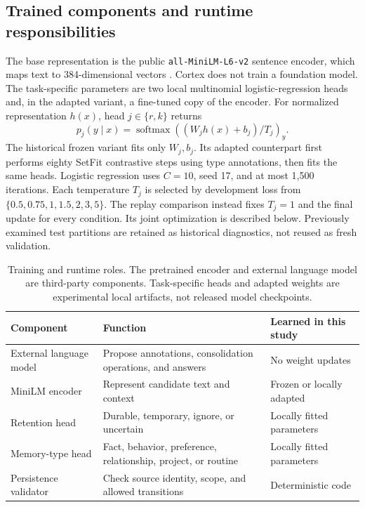 \documentclass[11pt]{article}
\begin{document}
\subsection{Trained components and runtime responsibilities}
The base representation is the public \texttt{all-MiniLM-L6-v2} sentence encoder, which maps text to 384-dimensional vectors \citep{minilmcard}. Cortex does not train a foundation model. The task-specific parameters are two local multinomial logistic-regression heads and, in the adapted variant, a fine-tuned copy of the encoder. For normalized representation $h(x)$, head $j\in\{r,k\}$ returns
\[
 p_j(y\mid x)=\operatorname{softmax}\!\left((W_jh(x)+b_j)/T_j\right)_y.
\]
The historical frozen variant fits only $W_j,b_j$. Its adapted counterpart first performs eighty SetFit contrastive steps using type annotations, then fits the same heads. Logistic regression uses $C=10$, seed 17, and at most 1,500 iterations. Each temperature $T_j$ is selected by development loss from $\{0.5,0.75,1,1.5,2,3,5\}$. The replay comparison instead fixes $T_j=1$ and the final update for every condition. Its joint optimization is described below. Previously examined test partitions are retained as historical diagnostics, not reused as fresh validation.

\begin{table}[htbp]
\centering\small
\begin{tabularx}{\linewidth}{@{}L{.23\linewidth}Y L{.26\linewidth}@{}}
\toprule
Component & Function & Learned in this study\\
\midrule
External language model & Propose annotations, consolidation operations, and answers & No weight updates\\
MiniLM encoder & Represent candidate text and context & Frozen or locally adapted\\
Retention head & Durable, temporary, ignore, or uncertain & Locally fitted parameters\\
Memory-type head & Fact, behavior, preference, relationship, project, or routine & Locally fitted parameters\\
Persistence validator & Check source identity, scope, and allowed transitions & Deterministic code\\
\bottomrule
\end{tabularx}
\caption{Training and runtime roles. The pretrained encoder and external language model are third-party components. Task-specific heads and adapted weights are experimental local artifacts, not released model checkpoints.}
\label{tab:components}
\end{table}
\end{document}
